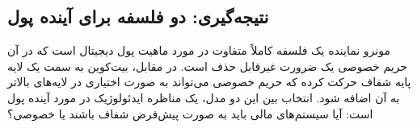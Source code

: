 \subsection{نتیجه‌گیری: دو فلسفه برای آینده پول}
مونرو نماینده یک فلسفه کاملاً متفاوت در مورد ماهیت پول دیجیتال است که در آن حریم خصوصی یک ضرورت غیرقابل حذف است. در مقابل، بیت‌کوین به سمت یک لایه پایه شفاف حرکت کرده که حریم خصوصی می‌تواند به صورت اختیاری در لایه‌های بالاتر به آن اضافه شود. انتخاب بین این دو مدل، یک مناظره ایدئولوژیک در مورد آینده پول است: آیا سیستم‌های مالی باید به صورت پیش‌فرض شفاف باشند یا خصوصی؟
